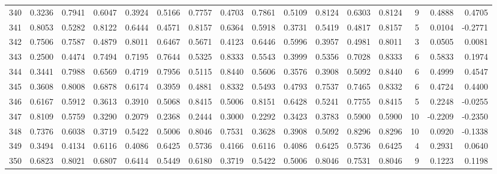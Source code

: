 \begin{tabular}{lrrrrrrrrrrrrrrr}
340 &      0.3236 &  0.7941 &  0.6047 &  0.3924 &  0.5166 &  0.7757 &  0.4703 &  0.7861 &  0.5109 &  0.8124 &   0.6303 &     0.8124 &      9 &                    0.4888 &                     0.4705 \\
341 &      0.8053 &  0.5282 &  0.8122 &  0.6444 &  0.4571 &  0.8157 &  0.6364 &  0.5918 &  0.3731 &  0.5419 &   0.4817 &     0.8157 &      5 &                    0.0104 &                    -0.2771 \\
342 &      0.7506 &  0.7587 &  0.4879 &  0.8011 &  0.6467 &  0.5671 &  0.4123 &  0.6446 &  0.5996 &  0.3957 &   0.4981 &     0.8011 &      3 &                    0.0505 &                     0.0081 \\
343 &      0.2500 &  0.4474 &  0.7494 &  0.7195 &  0.7644 &  0.5325 &  0.8333 &  0.5543 &  0.3999 &  0.5356 &   0.7028 &     0.8333 &      6 &                    0.5833 &                     0.1974 \\
344 &      0.3441 &  0.7988 &  0.6569 &  0.4719 &  0.7956 &  0.5115 &  0.8440 &  0.5606 &  0.3576 &  0.3908 &   0.5092 &     0.8440 &      6 &                    0.4999 &                     0.4547 \\
345 &      0.3608 &  0.8008 &  0.6878 &  0.6174 &  0.3959 &  0.4881 &  0.8332 &  0.5493 &  0.4793 &  0.7537 &   0.7465 &     0.8332 &      6 &                    0.4724 &                     0.4400 \\
346 &      0.6167 &  0.5912 &  0.3613 &  0.3910 &  0.5068 &  0.8415 &  0.5006 &  0.8151 &  0.6428 &  0.5241 &   0.7755 &     0.8415 &      5 &                    0.2248 &                    -0.0255 \\
347 &      0.8109 &  0.5759 &  0.3290 &  0.2079 &  0.2368 &  0.2444 &  0.3000 &  0.2292 &  0.3423 &  0.3783 &   0.5900 &     0.5900 &     10 &                   -0.2209 &                    -0.2350 \\
348 &      0.7376 &  0.6038 &  0.3719 &  0.5422 &  0.5006 &  0.8046 &  0.7531 &  0.3628 &  0.3908 &  0.5092 &   0.8296 &     0.8296 &     10 &                    0.0920 &                    -0.1338 \\
349 &      0.3494 &  0.4134 &  0.6116 &  0.4086 &  0.6425 &  0.5736 &  0.4166 &  0.6116 &  0.4086 &  0.6425 &   0.5736 &     0.6425 &      4 &                    0.2931 &                     0.0640 \\
350 &      0.6823 &  0.8021 &  0.6807 &  0.6414 &  0.5449 &  0.6180 &  0.3719 &  0.5422 &  0.5006 &  0.8046 &   0.7531 &     0.8046 &      9 &                    0.1223 &                     0.1198 \\

\end{tabular}
